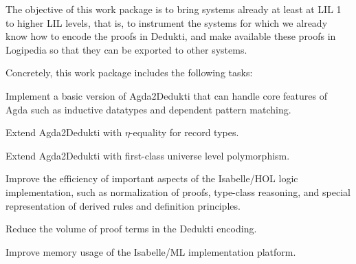 \begin{workpackage}[id=instrumentation,type=RTD,
  short=Integration,%
  title=Integration,
  lead=Del,
  DelRM=14,
  GotRM=4,
  TumRM=5,
  ChaRM=20,
  CleRM=0,  %
  ImtRM=0,  %
  TouRM=0,  %
  BolRM=16, %
  InrRM=0]  %

\begin{wpobjectives}
  The objective of this work package is to bring systems already at least at
  LIL 1 to higher LIL levels, that is, to instrument the systems
  for which we already know how to encode the proofs in Dedukti, and
  make available these proofs in Logipedia so that
  they can be exported to other systems.
\end{wpobjectives}

\begin{wpdescription}
  Concretely, this work package includes the following tasks:
\end{wpdescription}

\begin{tasklist}
\begin{task}[id=agda,
  title=Instrument Agda,
  lead=Del,
  DelRM=14,
  GotRM=4]
%
\begin{compactitem}
\item Implement a basic version of Agda2Dedukti that can handle core
  features of Agda such as inductive datatypes and dependent pattern
  matching.
\item Extend Agda2Dedukti with $\eta$-equality for record types.
\item Extend Agda2Dedukti with first-class universe level polymorphism.
\end{compactitem}
\end{task}

\begin{task}[id=isabelle,
  title=Instrument Isabelle,
  lead=Tum,
  TumRM=5]
%
\begin{compactitem}
\item Improve the efficiency of important aspects of the
  Isabelle/HOL logic implementation, such as normalization of proofs,
  type-class reasoning, and special representation of derived rules
  and definition principles.
\item Reduce the volume of proof terms in the Dedukti encoding.
\item Improve memory usage of the Isabelle/ML implementation
  platform.
\end{compactitem}
\end{task}


\end{tasklist}
\end{workpackage}
